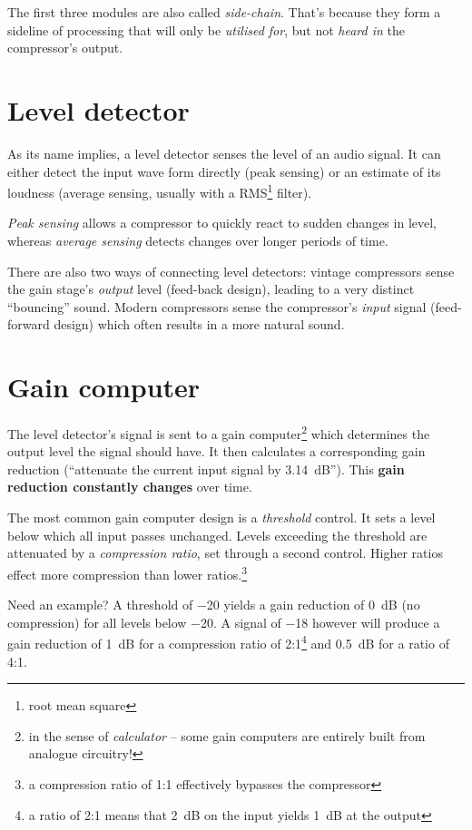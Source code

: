 The first three modules are also called \emph{side-chain}.  That's
because they form a sideline of processing that will only be
\emph{utilised for}, but not \emph{heard in} the compressor's output.

\section{Level detector}
\label{sec:level_detector}

As its name implies, a level detector senses the level of an audio
signal.  It can either detect the input wave form directly (peak
sensing) or an estimate of its loudness (average sensing, usually with
a RMS\footnote{root mean square} filter).

\emph{Peak sensing} allows a compressor to quickly react to sudden
changes in level, whereas \emph{average sensing} detects changes over
longer periods of time.

There are also two ways of connecting level detectors: vintage
compressors sense the gain stage's \emph{output} level (feed-back
design), leading to a very distinct ``bouncing'' sound.  Modern
compressors sense the compressor's \emph{input} signal (feed-forward
design) which often results in a more natural sound.

\section{Gain computer}
\label{sec:gain_computer}

The level detector's signal is sent to a gain computer\footnote{in the
  sense of \emph{calculator} -- some gain computers are entirely built
  from analogue circuitry!} which determines the output level the
signal should have.  It then calculates a corresponding gain reduction
(``attenuate the current input signal by \SI{3.14}{\dB}'').  This
\textbf{gain reduction constantly changes} over time.

The most common gain computer design is a \emph{threshold} control.
It sets a level below which all input passes unchanged.  Levels
exceeding the threshold are attenuated by a \emph{compression ratio},
set through a second control.  Higher ratios effect more compression
than lower ratios.\footnote{a compression ratio of 1:1 effectively
  bypasses the compressor}

Need an example?  A threshold of \SI{-20}{\dBFS} yields a gain
reduction of \SI{0}{\dB} (no compression) for all levels below
\SI{-20}{\dBFS}.  A signal of \SI{-18}{\dBFS} however will produce a
gain reduction of \SI{1}{\dB} for a compression ratio of
2:1\footnote{a ratio of 2:1 means that \SI{2}{\dB} on the input yields
  \SI{1}{\dB} at the output} and \SI{0.5}{\dB} for a ratio of 4:1.

